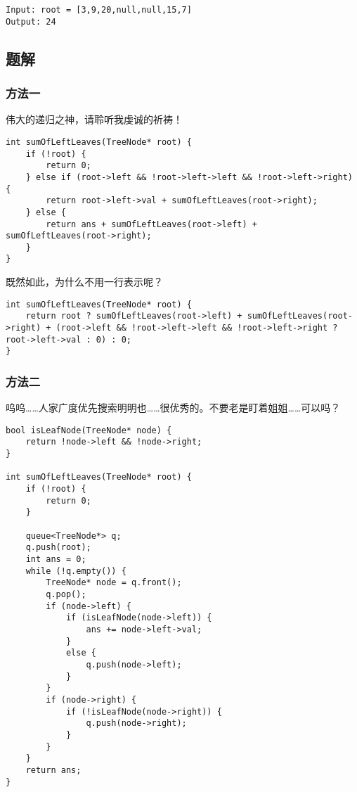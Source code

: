 \documentclass[lang=cn,10pt]{elegantbook}
\begin{document}
\begin{lstlisting}
Input: root = [3,9,20,null,null,15,7] 
Output: 24
\end{lstlisting}

\subsection*{题解}

\subsubsection*{方法一}

伟大的递归之神，请聆听我虔诚的祈祷！

\begin{lstlisting}
int sumOfLeftLeaves(TreeNode* root) {
	if (!root) {
		return 0;
	} else if (root->left && !root->left->left && !root->left->right) {
		return root->left->val + sumOfLeftLeaves(root->right);
	} else {
		return ans + sumOfLeftLeaves(root->left) + sumOfLeftLeaves(root->right);
	}
}
\end{lstlisting}

既然如此，为什么不用一行表示呢？

\begin{lstlisting}
int sumOfLeftLeaves(TreeNode* root) {
	return root ? sumOfLeftLeaves(root->left) + sumOfLeftLeaves(root->right) + (root->left && !root->left->left && !root->left->right ? root->left->val : 0) : 0;
}
\end{lstlisting}

\subsubsection*{方法二}

呜呜……人家广度优先搜索明明也……很优秀的。不要老是盯着姐姐……可以吗？

\begin{lstlisting}
bool isLeafNode(TreeNode* node) {
	return !node->left && !node->right;
}

int sumOfLeftLeaves(TreeNode* root) {
	if (!root) {
		return 0;
	}
	
	queue<TreeNode*> q;
	q.push(root);
	int ans = 0;
	while (!q.empty()) {
		TreeNode* node = q.front();
		q.pop();
		if (node->left) {
			if (isLeafNode(node->left)) {
				ans += node->left->val;
			}
			else {
				q.push(node->left);
			}
		}
		if (node->right) {
			if (!isLeafNode(node->right)) {
				q.push(node->right);
			}
		}
	}
	return ans;
}
\end{lstlisting}
\end{document}

